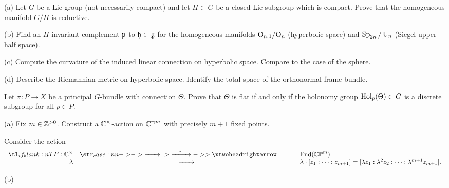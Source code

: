 \documentclass{../../templates/lkx_pset}
\begin{document}
\begin{problem}{2}
\end{problem}
\begin{parts}
  \begin{part}{(a)}
    Let $G$ be a Lie group (not necessarily compact) and let $H\subset G$ be a closed Lie subgroup which is compact. Prove that the homogeneous manifold $G/H$ is reductive.
  \end{part}

  \begin{part}{(b)}
    Find an $H$-invariant complement $\mathfrak{p}$ to $\mathfrak{h}\subset \mathfrak{g}$ for the homogeneous manifolds ${\operatorname{O}}_{n,1} / {\operatorname{O}}_n$ (hyperbolic space) and $\operatorname{Sp}_{2n} / \operatorname{U}_n$ (Siegel upper half space).
  \end{part}

  \begin{part}{(c)}
    Compute the curvature of the induced linear connection on hyperbolic space. Compare to the case of the sphere.
  \end{part}

  \begin{part}{(d)}
    Describe the Riemannian metric on hyperbolic space. Identify the total space of the orthonormal frame bundle.
  \end{part}
\end{parts}

\begin{problem}{3}
  Let $\pi : P \to X$ be a principal $G$-bundle with connection $\Theta$. Prove that $\Theta$ is flat if and only if the holonomy group $\operatorname{Hol}_p(\Theta)\subset G$ is a discrete subgroup for all $p\in P$.
\end{problem}

\begin{problem}{6}
\end{problem}
\begin{parts}
  \begin{part}{(a)}
    Fix $m\in \mathbb{Z}^{>0}$. Construct a $\mathbb{C}^\times$-action on $\mathbb{CP}^m$ with precisely $m+1$ fixed points.
  \end{part}

    Consider the action
    \[
      \lkxfunc{}{\C^\times}{\End(\CP^m)}{\lambda}{\lambda\cdot[z_1:\cdots:z_{m+1}] = [\lambda z_1 : \lambda^2 z_2 : \cdots : \lambda^{m+1} z_{m+1}].}
    \]

  \begin{part}{(b)}
  \end{part}
\end{parts}
\end{document}

